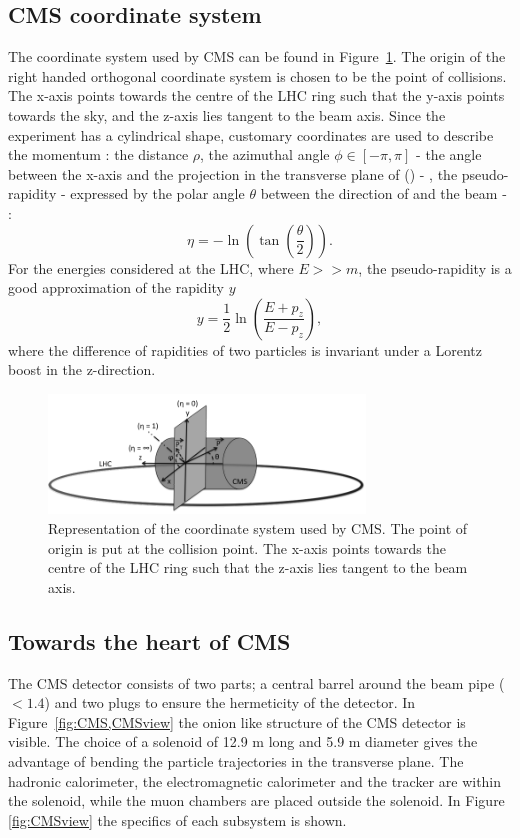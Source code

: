 \subsection{CMS coordinate system}
The coordinate system used by CMS can be found in Figure~\ref{fig:CMScoord}. The origin of the right handed orthogonal coordinate system is chosen to be the point of collisions. The x-axis points towards the centre of the LHC ring such that the y-axis points towards the sky, and the z-axis lies tangent to the beam axis. Since the experiment has a cylindrical shape, customary coordinates are used to describe the momentum \impuls: the distance $\rho$, the azimuthal angle $\phi \in \left[-\pi,\pi\right]$ - the angle between the x-axis and the projection in the transverse plane of \impuls (\trimpuls) - , the pseudo-rapidity \psrap - expressed by the polar angle $\theta$ between the direction of \impuls and the beam - : 
\begin{equation}
\eta = - \ln \left(\tan \left(\frac{\theta}{2}\right)\right).
\end{equation}
For the energies considered at the LHC, where $E >> m$, the pseudo-rapidity is a good approximation of the rapidity $y$
\begin{equation}
y = \frac{1}{2} \ln \left(\frac{E + p_z}{E - p_z}\right), 
\end{equation}
where the difference of rapidities of two particles is invariant under a Lorentz boost in the z-direction.
 \begin{figure}[ht]
	\centering
	\includegraphics[width=0.75\textwidth]{2_ExperimentalSetup/Figures/imageedit_1_9146672677}
	\caption{Representation of the coordinate system used by CMS. The point of origin is put at the collision point. The x-axis points towards the centre of the LHC ring such that the z-axis lies tangent to the beam axis. }
	\label{fig:CMScoord}
\end{figure}

\subsection{Towards the heart of CMS}
The CMS detector consists of two parts; a central barrel around the beam pipe (\abspsrap $<1.4$) and two plugs to ensure the hermeticity of the detector. In Figure~\ref{fig:CMS,CMSview} the onion like structure of the CMS detector is visible. The choice of a solenoid of 12.9 \si{ \meter}  long and 5.9 \si{ \meter}
diameter gives the advantage of bending the particle trajectories in the transverse plane. The hadronic calorimeter,  the electromagnetic calorimeter and the tracker are within the solenoid, while the muon chambers are placed outside the solenoid.
In Figure \ref{fig:CMSview} the specifics of each subsystem is shown.


